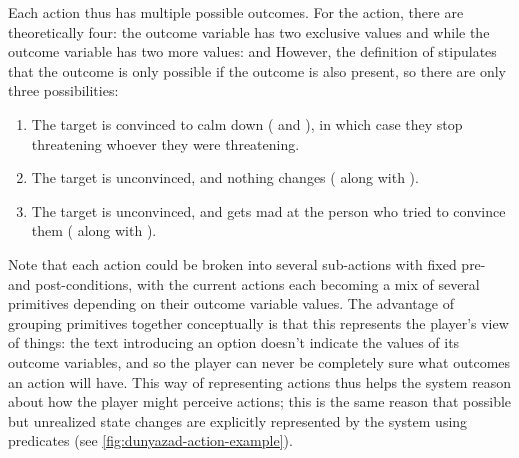 Each action thus has multiple possible outcomes.
%
For the  action, there are theoretically four: the  outcome variable has two exclusive values  and  while the  outcome variable has two more values:  and 
%
However, the definition of  stipulates that the outcome  is only possible if the outcome  is also present, so there are only three possibilities:

\begin{enumerate}
  \item The target is convinced to calm down ( and ), in which case they stop threatening whoever they were threatening.
  \item The target is unconvinced, and nothing changes ( along with ).
  \item The target is unconvinced, and gets mad at the person who tried to convince them ( along with ).
\end{enumerate}

Note that each action could be broken into several sub-actions with fixed pre- and post-conditions, with the current actions each becoming a mix of several primitives depending on their outcome variable values.
%
The advantage of grouping primitives together conceptually is that this represents the player's view of things: the text introducing an option doesn't indicate the values of its outcome variables, and so the player can never be completely sure what outcomes an action will have.
%
This way of representing actions thus helps the system reason about how the player might perceive actions; this is the same reason that possible but unrealized state changes are explicitly represented by the system using  predicates (see \cref{fig:dunyazad-action-example}).


